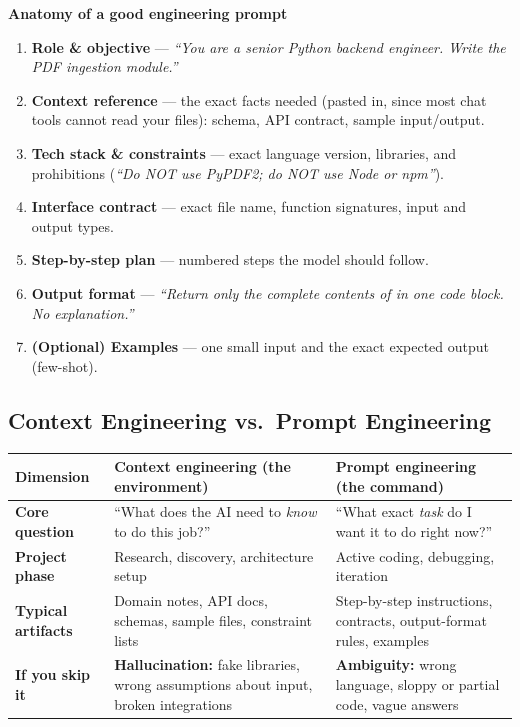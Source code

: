 \documentclass[11pt,a4paper]{article}
\newcommand{\fn}[1]{\texttt{\detokenize{#1}}}
\begin{document}
\textbf{Anatomy of a good engineering prompt}
\begin{enumerate}
\item \textbf{Role \& objective} --- \emph{``You are a senior Python backend engineer. Write the PDF ingestion module.''}
\item \textbf{Context reference} --- the exact facts needed (pasted in, since most chat tools cannot read your files): schema, API contract, sample input/output.
\item \textbf{Tech stack \& constraints} --- exact language version, libraries, and prohibitions (\emph{``Do NOT use PyPDF2; do NOT use Node or npm''}).
\item \textbf{Interface contract} --- exact file name, function signatures, input and output types.
\item \textbf{Step-by-step plan} --- numbered steps the model should follow.
\item \textbf{Output format} --- \emph{``Return only the complete contents of \fn{parser.py} in one code block. No explanation.''}
\item \textbf{(Optional) Examples} --- one small input and the exact expected output (few-shot).
\end{enumerate}

\subsection{Context Engineering vs.\ Prompt Engineering}
\begin{tabularx}{\textwidth}{@{}>{\bfseries}p{3.1cm}LL@{}}
\toprule
\textbf{Dimension} & \textbf{Context engineering (the environment)} & \textbf{Prompt engineering (the command)}\\
\midrule
Core question & ``What does the AI need to \emph{know} to do this job?'' & ``What exact \emph{task} do I want it to do right now?''\\
Project phase & Research, discovery, architecture setup & Active coding, debugging, iteration\\
Typical artifacts & Domain notes, API docs, schemas, sample files, constraint lists & Step-by-step instructions, contracts, output-format rules, examples\\
If you skip it & \textbf{Hallucination:} fake libraries, wrong assumptions about input, broken integrations & \textbf{Ambiguity:} wrong language, sloppy or partial code, vague answers\\
\bottomrule
\end{tabularx}
\end{document}

